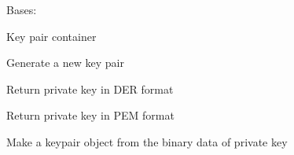 \documentclass[letterpaper,10pt,english]{sphinxmanual}
\begin{document}
\begin{fulllineitems}
\label{\detokenize{bbc1.core.bbclib:bbc1.core.bbclib.KeyPair}}
Bases: 

Key pair container

\begin{fulllineitems}
\label{\detokenize{bbc1.core.bbclib:bbc1.core.bbclib.KeyPair.generate}}
Generate a new key pair

\end{fulllineitems}


\begin{fulllineitems}
\label{\detokenize{bbc1.core.bbclib:bbc1.core.bbclib.KeyPair.get_private_key_in_der}}
Return private key in DER format

\end{fulllineitems}


\begin{fulllineitems}
\label{\detokenize{bbc1.core.bbclib:bbc1.core.bbclib.KeyPair.get_private_key_in_pem}}
Return private key in PEM format

\end{fulllineitems}


\begin{fulllineitems}
\label{\detokenize{bbc1.core.bbclib:bbc1.core.bbclib.KeyPair.mk_keyobj_from_private_key}}
Make a keypair object from the binary data of private key

\end{fulllineitems}



\end{fulllineitems}
\end{document}
